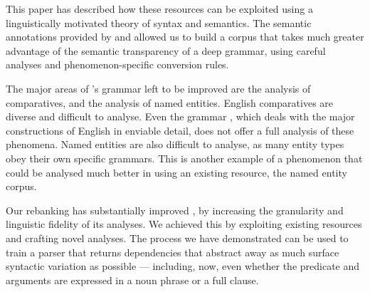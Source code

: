 \documentclass[11pt]{article}
\begin{document}
This paper has described how these resources can be exploited
using a linguistically motivated theory of syntax and semantics. The semantic
annotations provided by \propbank and \nombank allowed us to build a corpus
that takes much greater advantage of the semantic transparency of a deep grammar,
using careful analyses and phenomenon-specific conversion rules.

The major areas of \ccgbank's grammar left to be improved are the analysis
of comparatives, and the analysis of named entities. English comparatives are
diverse and difficult to analyse. Even the \xtag grammar \citep{xtag}, which
deals with the major constructions of English in enviable detail, does not
offer a full analysis of these phenomena. Named entities are also difficult to
analyse, as many entity types obey their own specific grammars. This is another
example of a phenomenon that could be analysed much better in \ccgbank using an
existing resource, the \bbn named entity corpus.

Our rebanking has substantially improved \ccgbank, by increasing the granularity
and linguistic fidelity of its analyses. We achieved this by exploiting existing
resources and crafting novel analyses. The process we have demonstrated can be
used to train a parser that returns dependencies that abstract
away as much surface syntactic variation as possible --- including, now, even
whether the predicate and arguments are expressed in a noun phrase or a full
clause.

\begin{small}

\end{small}

\end{document}
